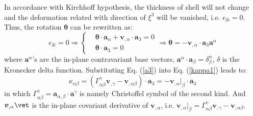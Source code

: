 In accordance with Kirchhoff hypothesis, the thickness of shell will not change and the deformation related with direction of $\xi^3$ will be vanished, i.e. $\epsilon_{3i}=0$. Thus, the rotation $\boldsymbol \theta$ can be rewritten as:
\begin{equation}\label{a3}
\epsilon_{3i} = 0 \Rightarrow
\left \{
\begin{split}
&\boldsymbol \theta \cdot \boldsymbol a_\alpha + \boldsymbol v_{,\alpha} \cdot \boldsymbol a_3 = 0 \\
&\boldsymbol \theta \cdot \boldsymbol a_3 = 0
\end{split}
\right .
\Rightarrow \boldsymbol \theta = - \boldsymbol v_{,\alpha} \cdot \boldsymbol a_3 \boldsymbol a^\alpha
\end{equation}
where $\boldsymbol a^\alpha$'s are the in-plane contravariant base vectors, $\boldsymbol a^\alpha \cdot \boldsymbol a_\beta = \delta^\alpha_\beta$, $\delta$ is the Kronecker delta function. Substituting Eq. (\ref{a3}) into Eq. (\ref{kappa1}) leads to:
\begin{equation}
\kappa_{\alpha\beta} = (\Gamma^\gamma_{\alpha\beta} \boldsymbol v_{,\gamma} - \boldsymbol v_{,\alpha\beta}) \cdot \boldsymbol a_3 = - \boldsymbol v_{,\alpha}\vert_\beta \cdot \boldsymbol a_3
\end{equation}
in which $\Gamma^\gamma_{\alpha\beta} = \boldsymbol a_{\alpha,\beta} \cdot \boldsymbol a^\gamma$ is namely Christoffel symbol of the second kind. And $\boldsymbol v_{,\alpha}\vet$ is the in-plane covariant derivative of $\boldsymbol v_{,\alpha}$, i.e. $\boldsymbol v_{,\alpha}\vert_\beta = \Gamma^\gamma_{\alpha\beta}\boldsymbol v_{,\gamma} - \boldsymbol v_{,\alpha\beta}$.

